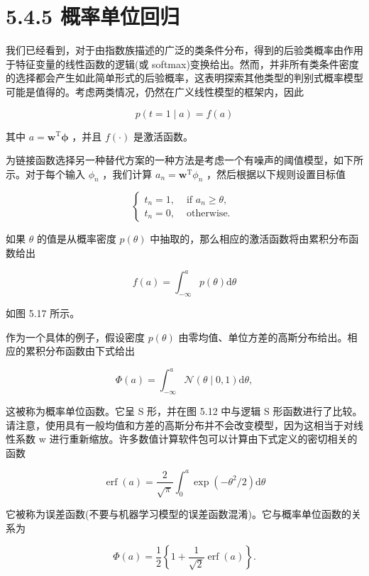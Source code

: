 \documentclass[10pt]{article}
\begin{document}
\section*{5.4.5 概率单位回归}

我们已经看到，对于由指数族描述的广泛的类条件分布，得到的后验类概率由作用于特征变量的线性函数的逻辑(或 softmax)变换给出。然而，并非所有类条件密度的选择都会产生如此简单形式的后验概率，这表明探索其他类型的判别式概率模型可能是值得的。考虑两类情况，仍然在广义线性模型的框架内，因此

\[
p\left( {t = 1 \mid  a}\right)  = f\left( a\right)  \tag{5.83}
\]

其中 \(a = {\mathbf{w}}^{\mathrm{T}}\mathbf{\phi }\) ，并且 \(f\left( \cdot \right)\) 是激活函数。

为链接函数选择另一种替代方案的一种方法是考虑一个有噪声的阈值模型，如下所示。对于每个输入 \({\phi }_{n}\) ，我们计算 \({a}_{n} = {\mathbf{w}}^{\mathrm{T}}{\phi }_{n}\) ，然后根据以下规则设置目标值

\[
\left\{  \begin{array}{ll} {t}_{n} = 1, & \text{ if }{a}_{n} \geq  \theta , \\  {t}_{n} = 0, & \text{ otherwise. } \end{array}\right.  \tag{5.84}
\]

如果 \(\theta\) 的值是从概率密度 \(p\left( \theta \right)\) 中抽取的，那么相应的激活函数将由累积分布函数给出

\[
f\left( a\right)  = {\int }_{-\infty }^{a}p\left( \theta \right) \mathrm{d}\theta  \tag{5.85}
\]

如图 5.17 所示。

作为一个具体的例子，假设密度 \(p\left( \theta \right)\) 由零均值、单位方差的高斯分布给出。相应的累积分布函数由下式给出

\[
\Phi \left( a\right)  = {\int }_{-\infty }^{a}\mathcal{N}\left( {\theta  \mid  0,1}\right) \mathrm{d}\theta , \tag{5.86}
\]

这被称为概率单位函数。它呈 S 形，并在图 5.12 中与逻辑 S 形函数进行了比较。请注意，使用具有一般均值和方差的高斯分布并不会改变模型，因为这相当于对线性系数 w 进行重新缩放。许多数值计算软件包可以计算由下式定义的密切相关的函数

\[
\operatorname{erf}\left( a\right)  = \frac{2}{\sqrt{\pi }}{\int }_{0}^{a}\exp \left( {-{\theta }^{2}/2}\right) \mathrm{d}\theta  \tag{5.87}
\]

它被称为误差函数(不要与机器学习模型的误差函数混淆)。它与概率单位函数的关系为

\[
\Phi \left( a\right)  = \frac{1}{2}\left\{  {1 + \frac{1}{\sqrt{2}}\operatorname{erf}\left( a\right) }\right\}  . \tag{5.88}
\]
\end{document}

